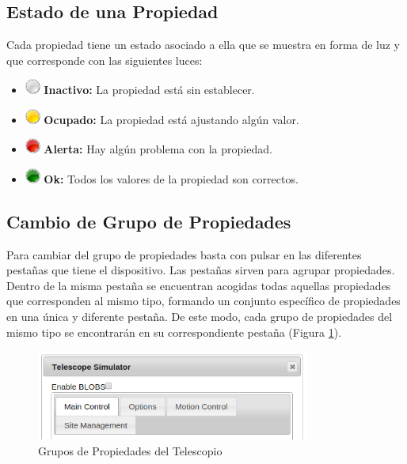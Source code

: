 \subsection{Estado de una Propiedad}
Cada propiedad tiene un estado asociado a ella que se muestra en forma de luz y que corresponde con las siguientes luces:
\begin{itemize}
  \item \includegraphics[width=0.5cm]{./imagenes/grey_light} \textbf{Inactivo:} La propiedad está sin establecer.
  \item \includegraphics[width=0.5cm]{./imagenes/yellow_light} \textbf{Ocupado:} La propiedad está ajustando algún valor.
  \item \includegraphics[width=0.5cm]{./imagenes/red_light} \textbf{Alerta:} Hay algún problema con la propiedad.
  \item \includegraphics[width=0.5cm]{./imagenes/green_light} \textbf{Ok:} Todos los valores de la propiedad son correctos.
\end{itemize}

\subsection{Cambio de Grupo de Propiedades}
Para cambiar del grupo de propiedades basta con pulsar en las diferentes pestañas que tiene el dispositivo. Las pestañas sirven para agrupar propiedades. Dentro de la misma pestaña se encuentran acogidas todas aquellas propiedades que corresponden al mismo tipo, formando un conjunto específico de propiedades en una única y diferente pestaña. De este modo, cada grupo de propiedades del mismo tipo se encontrarán en su correspondiente pestaña (Figura \ref{fig:gruposPropiedades}).
\begin{figure}[htb]
\centering
\includegraphics[width=0.8\textwidth]{./imagenes/capturaGrupos}
\caption{Grupos de Propiedades del Telescopio} \label{fig:gruposPropiedades}
\end{figure}

